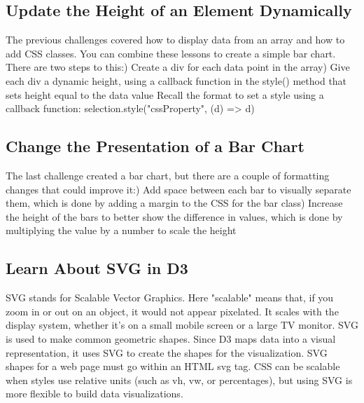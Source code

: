 \documentclass{article}%
\begin{document}
\subsection{Update the Height of an Element Dynamically}%
\label{subsec:UpdatetheHeightofanElementDynamically}%
The previous challenges covered how to display data from an array and how to add CSS classes. You can combine these lessons to create a simple bar chart. There are two steps to this:) Create a div for each data point in the array) Give each div a dynamic height, using a callback function in the style() method that sets height equal to the data value\newline%
Recall the format to set a style using a callback function:\newline%
selection.style("cssProperty", (d) => d)\newline%

%
\subsection{Change the Presentation of a Bar Chart}%
\label{subsec:ChangethePresentationofaBarChart}%
The last challenge created a bar chart, but there are a couple of formatting changes that could improve it:) Add space between each bar to visually separate them, which is done by adding a margin to the CSS for the bar class) Increase the height of the bars to better show the difference in values, which is done by multiplying the value by a number to scale the height\newline%

%
\subsection{Learn About SVG in D3}%
\label{subsec:LearnAboutSVGinD3}%
SVG stands for Scalable Vector Graphics.\newline%
Here "scalable" means that, if you zoom in or out on an object, it would not appear pixelated. It scales with the display system, whether it's on a small mobile screen or a large TV monitor.\newline%
SVG is used to make common geometric shapes. Since D3 maps data into a visual representation, it uses SVG to create the shapes for the visualization. SVG shapes for a web page must go within an HTML svg tag.\newline%
CSS can be scalable when styles use relative units (such as vh, vw, or percentages), but using SVG is more flexible to build data visualizations.\newline%
\end{document}
